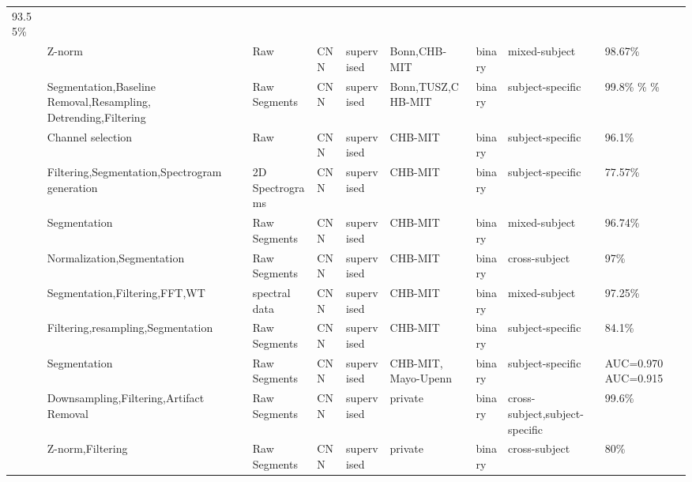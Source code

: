 \begin{table*}[ht]
\begin{tabular}{p{0.4cm}p{2.8cm}p{2cm}p{1.5cm}p{1.9cm}p{1.9cm}p{0.8cm}p{1.8cm}p{2cm}}
93.55\% \\
~\cite{Seizure76} & Z-norm & Raw & CNN & supervised & Bonn,\newline CHB-MIT & binary & mixed-subject & 98.67\% \\
~\cite{Seizure77} & Segmentation,Baseline Removal,Resampling,
Detrending,Filtering & Raw Segments & CNN & supervised & Bonn,\newline TUSZ,\newline CHB-MIT & binary & subject-specific & 99.8\% \newline
92\% \newline
95.96\% \\
~\cite{Seizure78} & Channel selection & Raw & CNN & supervised & CHB-MIT & binary & subject-specific & 96.1\% \\
~\cite{Seizure79} & Filtering,Segmentation,\newline Spectrogram generation & 2D Spectrograms & CNN & supervised & CHB-MIT & binary & subject-specific & 77.57\% \\
~\cite{Seizure80} & Segmentation & Raw Segments & CNN & supervised & CHB-MIT & binary & mixed-subject & 96.74\% \\
~\cite{Seizure81} & Normalization,\newline Segmentation & Raw Segments & CNN & supervised & CHB-MIT & binary & cross-subject & 97\% \\
~\cite{Seizure82} & Segmentation,Filtering,\newline FFT,WT & spectral data & CNN & supervised & CHB-MIT & binary & mixed-subject & 97.25\% \\
~\cite{Seizure83} & Filtering,resampling,\newline Segmentation & Raw Segments & CNN & supervised & CHB-MIT & binary & subject-specific & 84.1\% \\
~\cite{Seizure84} & Segmentation & Raw Segments & CNN & supervised & CHB-MIT, \newline Mayo-Upenn & binary & subject-specific & AUC=0.970 \newline
AUC=0.915 \\
~\cite{Seizure85} & Downsampling,Filtering,\newline Artifact Removal & Raw Segments & CNN & supervised & private & binary & cross-subject,\newline subject-specific & 99.6\% \\
~\cite{Seizure86} & Z-norm,Filtering & Raw Segments & CNN & supervised & private & binary & cross-subject & 80\% \\

\end{tabular}
\end{table*}
